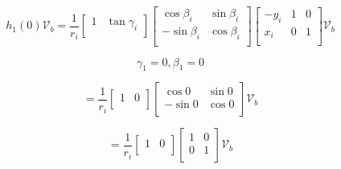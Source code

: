 \documentclass{article}
\begin{document}
\begin{equation}
    h_1(0) \mathcal{V}_b = \frac{1}{r_i} \left[\begin{array}{cc}
            1 & \tan\gamma_i \\
        \end{array}\right]
    \left[\begin{array}{cc}
            \cos \beta_i  & \sin \beta_i \\
            -\sin \beta_i & \cos \beta_i \\
        \end{array}\right]
    \begin{bmatrix}
        -y_i & 1 & 0 \\
        x_i  & 0 & 1 \\
    \end{bmatrix} \mathcal{V}_b
\end{equation}

\begin{equation}
    \gamma_1 = 0, \beta_1 = 0
\end{equation}

\begin{equation}
    = \frac{1}{r_i} \left[\begin{array}{cc}
            1 & 0 \\
        \end{array}\right]
    \left[\begin{array}{cc}
            \cos 0  & \sin 0 \\
            -\sin 0 & \cos 0 \\
        \end{array}\right] \mathcal{V}_b
\end{equation}

\begin{equation}
    = \frac{1}{r_i} \left[\begin{array}{cc}
            1 & 0 \\
        \end{array}\right]
    \left[
        \begin{array}{cc}
            1 & 0 \\
            0 & 1 \\
        \end{array}\right]
    \mathcal{V}_b
\end{equation}
\end{document}
